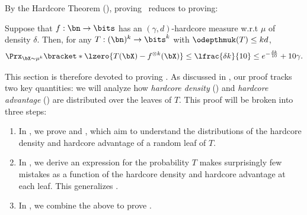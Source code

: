 By the Hardcore Theorem (), proving~ reduces to proving:  \medskip 

\begin{tcolorbox}[colback = white,arc=1mm, boxrule=0.25mm]
\begin{theorem}
    \label{thm:bounds-from-hardcore}
    Suppose that $f:\bn \to \bits$ has an $(\gamma, d)$-hardcore measure w.r.t $\mu$ of density $\delta$. Then, for any $T:(\bn)^k \to \bits^k$ with $\odepthmuk(T) \leq kd$,%
    \begin{equation*}
        \Prx_{\bX \sim \mu^k}\bracket*{\lzero{T(\bX) - f^{\otimes k}(\bX)} \leq \lfrac{\delta k}{10}} \leq e^{-\frac{\delta k}{10}} + 10\gamma.
    \end{equation*}
\end{theorem}
\end{tcolorbox}
\medskip 

This section is therefore devoted to proving .  As discussed in , our proof tracks two key quantities: we will analyze how {\sl hardcore density} () and {\sl hardcore advantage} () are distributed over the leaves of $T$. This proof will be broken into three steps:
\begin{enumerate}
    \item In , we prove  and , which aim to understand the distributions of the hardcore density and hardcore advantage of a random leaf of $T$.
    \item In , we derive an expression for the probability $T$ makes surprisingly few mistakes as a function of the hardcore density and hardcore advantage at each leaf. This generalizes .
    \item In , we combine the above  to prove .
\end{enumerate}

